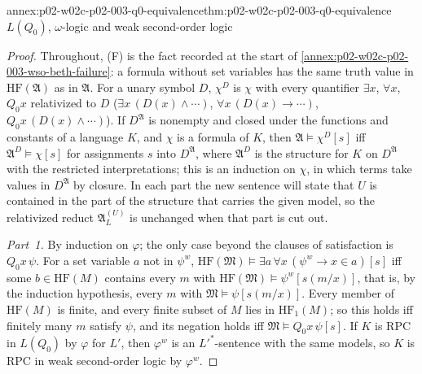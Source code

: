 \begin{annexitem}{annex:p02-w02c-p02-003-q0-equivalence}{thm:p02-w02c-p02-003-q0-equivalence}{\(L(Q_0)\), \(\omega\)-logic and weak second-order logic}
\begin{proof}
Throughout, (F) is the fact recorded at the start of
\cref{annex:p02-w02c-p02-003-wso-beth-failure}: a formula without set
variables has the same truth value in \(\mathrm{HF}(\mathfrak A)\) as in
\(\mathfrak A\).  For a unary symbol \(D\), \(\chi^{D}\) is \(\chi\) with
every quantifier \(\exists x\), \(\forall x\), \(Q_0x\) relativized to
\(D\) (\(\exists x\,(D(x)\land\cdots)\), \(\forall x\,(D(x)\to\cdots)\),
\(Q_0x\,(D(x)\land\cdots)\)).  If \(D^{\mathfrak A}\) is nonempty and closed
under the functions and constants of a language \(K\), and \(\chi\) is a
formula of \(K\), then \(\mathfrak A\models\chi^{D}[s]\) iff
\(\mathfrak A^{D}\models\chi[s]\) for assignments \(s\) into
\(D^{\mathfrak A}\), where \(\mathfrak A^{D}\) is the structure for \(K\) on
\(D^{\mathfrak A}\) with the restricted interpretations; this is an induction
on \(\chi\), in which terms take values in \(D^{\mathfrak A}\) by closure.
In each part the new sentence will state that \(U\) is contained in the
part of the structure that carries the given model, so the relativized
reduct \(\mathfrak A^{(U)}_{L}\) is unchanged when that part is cut out.

\emph{Part~1.}  By induction on \(\varphi\); the only case beyond the
clauses of satisfaction is \(Q_0x\,\psi\).  For a set variable \(a\) not in
\(\psi^{w}\), \(\mathrm{HF}(\mathfrak M)\models\exists a\,\forall x\,
(\psi^{w}\to x\in a)[s]\) iff some \(b\in\mathrm{HF}(M)\) contains every
\(m\) with \(\mathrm{HF}(\mathfrak M)\models\psi^{w}[s(m/x)]\), that is, by
the induction hypothesis, every \(m\) with \(\mathfrak M\models\psi[s(m/x)]\).
Every member of \(\mathrm{HF}(M)\) is finite, and every finite subset of
\(M\) lies in \(\mathrm{HF}_1(M)\); so this holds iff finitely many \(m\)
satisfy \(\psi\), and its negation holds iff
\(\mathfrak M\models Q_0x\,\psi[s]\).  If \(K\) is RPC in \(L(Q_0)\) by
\(\varphi\) for \(L'\), then \(\varphi^{w}\) is an \(L'^{*}\)-sentence with
the same models, so \(K\) is RPC in weak second-order logic by
\(\varphi^{w}\).


\end{proof}
\end{annexitem}
